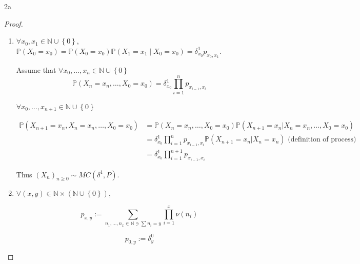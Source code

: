 \documentclass{article}
\newcommand{\PR}{\mathbb{P}}
\newcommand{\N}{\mathbb{N}}
\begin{document}
\bigskip

\begin{PROB}{2a}\label{Problem 2a.}
\end{PROB}
\begin{proof}
    \begin{enumerate}
        \item $\forall x_0, x_1 \in \N \cup \left\{ 0 \right\}$, $\PR(X_0 = x_0) = \PR(X_0 = x_0) \PR(X_1 = x_1 \mid X_0 = x_0) = \delta_{x_0}^1 p_{x_0, x_1}$.
        
        Assume that $\forall x_0, \dots, x_n \in \N \cup \left\{ 0 \right\}$ \[\PR(X_n = x_n, \dots, X_0 = x_0) = \delta_{x_0}^1 \prod_{i = 1}^{n} p_{x_{i - 1}, x_i}\]
        
        $\forall x_0, \dots, x_{n + 1} \in \N \cup \left\{ 0 \right\}$
        
        \begin{align*}
            \PR(X_{n + 1} = x_n, X_n = x_n, \dots, X_0 = x_0) &= \PR(X_n = x_n, \dots, X_0 = x_0) \PR(X_{n + 1} = x_n | X_n = x_n, \dots, X_0 = x_0) \\
            &= \delta_{x_0}^1 \prod_{i = 1}^{n} p_{x_{i - 1}, x_i} \PR(X_{n + 1} = x_n | X_n = x_n) \text{ (definition of process)} \\
            &= \delta_{x_0}^1 \prod_{i = 1}^{n + 1} p_{x_{i - 1}, x_i}
        \end{align*}

        Thus $\left(X_n\right)_{n \geq 0} \sim MC(\delta^1, P)$.
        
        
        \item $\forall (x, y) \in \N \times (\N \cup \left\{ 0 \right\})$, 
        
        \[p_{x, y} := \sum_{n_1, \dots, n_x \in \N \ni \sum n_i = y} \prod_{i = 1}^x \nu(n_i)\]

        \[p_{0, y}:= \delta_{y}^0\]
    \end{enumerate}
    
\end{proof}
\end{document}
